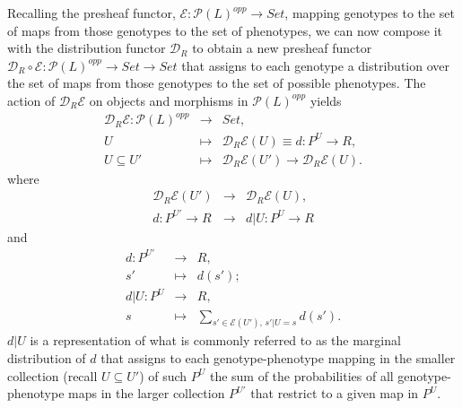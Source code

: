 Recalling the presheaf functor, $\mathcal{E} \colon \mathcal{P}(L)^{opp} \rightarrow Set$, mapping genotypes to the set of maps from those genotypes to the set of phenotypes, we can now compose it with the distribution functor $\mathcal{D}_R$ to obtain a new presheaf functor $\mathcal{D}_R \circ \mathcal{E} \colon \mathcal{P}(L)^{opp} \rightarrow Set \rightarrow Set$ that assigns to each genotype a distribution over the set of maps from those genotypes to the set of possible phenotypes. The action of $\mathcal{D}_R \mathcal{E}$ on objects and morphisms in $\mathcal{P}(L)^{opp}$ yields
\begin{eqnarray*}
\mathcal{D}_R \mathcal{E} \colon \mathcal{P}(L)^{opp} &\rightarrow& Set,\\
U &\mapsto& \mathcal{D}_R \mathcal{E}(U) \equiv d \colon P^U \rightarrow R,\\
U \subseteq U' &\mapsto& \mathcal{D}_R \mathcal{E}(U') \rightarrow \mathcal{D}_R \mathcal{E}(U).
\end{eqnarray*}
where
\begin{eqnarray*}
\mathcal{D}_R \mathcal{E}(U') &\rightarrow& \mathcal{D}_R \mathcal{E}(U),\\
d \colon P^{U'} \rightarrow R &\rightarrow& d|U \colon P^{U} \rightarrow R
\end{eqnarray*}
and
\begin{eqnarray*}
d \colon P^{U'} &\rightarrow& R,\\
s' &\mapsto& d(s');\\
d|U \colon P^{U} &\rightarrow& R,\\
s &\mapsto& \sum_{s' \in \mathcal{E}(U'),\, s'|U=s} d(s').
\end{eqnarray*}
$d|U$ is a representation of what is commonly referred to as the marginal distribution of $d$ that assigns to each genotype-phenotype mapping in the smaller collection (recall $U \subseteq U'$) of such $P^{U}$ the sum of the probabilities of all genotype-phenotype maps in the larger collection $P^{U'}$ that restrict to a given map in $P^{U}$.

